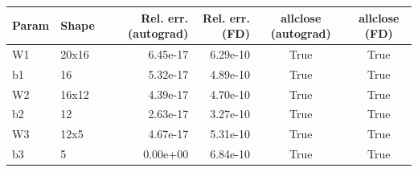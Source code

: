 \begin{tabular}{llrrcc}
\toprule
Param & Shape & Rel. err. (autograd) & Rel. err. (FD) & allclose (autograd) & allclose (FD) \\
\midrule
W1 & 20x16 & 6.45e-17 & 6.29e-10 & True & True \\
b1 & 16 & 5.32e-17 & 4.89e-10 & True & True \\
W2 & 16x12 & 4.39e-17 & 4.70e-10 & True & True \\
b2 & 12 & 2.63e-17 & 3.27e-10 & True & True \\
W3 & 12x5 & 4.67e-17 & 5.31e-10 & True & True \\
b3 & 5 & 0.00e+00 & 6.84e-10 & True & True \\
\bottomrule
\end{tabular}
